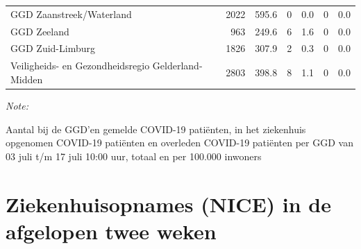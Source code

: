 \documentclass[
  english,
  man,floatsintext]{apa6}
\begin{document}
\begin{table}
\begin{threeparttable}
\begin{tabular}{lrrrrrr}
GGD Zaanstreek/Waterland & 2022 & 595.6 & 0 & 0.0 & 0 & 0.0\\
GGD Zeeland & 963 & 249.6 & 6 & 1.6 & 0 & 0.0\\
GGD Zuid-Limburg & 1826 & 307.9 & 2 & 0.3 & 0 & 0.0\\
Veiligheids- en Gezondheidsregio Gelderland-Midden & 2803 & 398.8 & 8 & 1.1 & 0 & 0.0\\
\bottomrule
\end{tabular}
\begin{tablenotes}
\item \textit{Note: } 
\item Aantal bij de GGD’en gemelde COVID-19 patiënten, in het ziekenhuis opgenomen COVID-19 patiënten en overleden COVID-19 patiënten per GGD van 03 juli t/m 17 juli 10:00 uur, totaal en per 100.000 inwoners
\end{tablenotes}
\end{threeparttable}
\endgroup{}
\end{table}

\newpage

\hypertarget{ziekenhuisopnames-nice-in-de-afgelopen-twee-weken}{%
\section{Ziekenhuisopnames (NICE) in de afgelopen twee weken}\label{ziekenhuisopnames-nice-in-de-afgelopen-twee-weken}}
\end{document}
